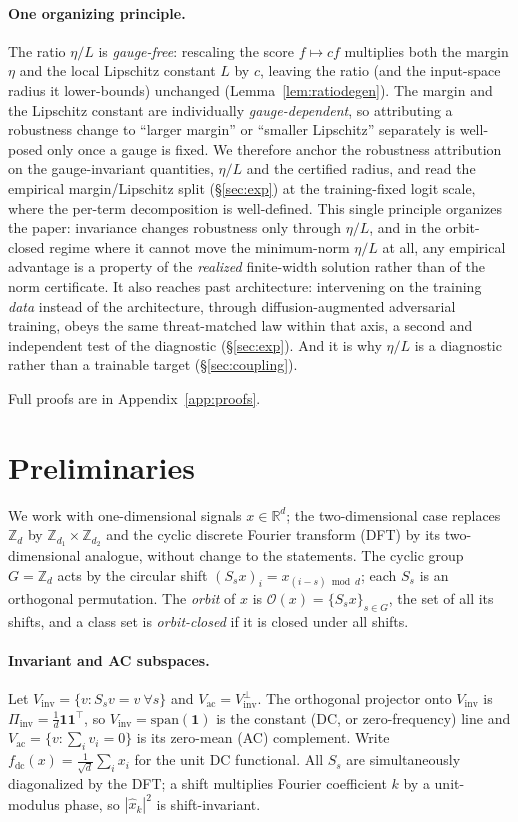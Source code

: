 \documentclass{article}
\theoremstyle{definition}
\newcommand{\R}{\mathbb{R}}
\newcommand{\Z}{\mathbb{Z}}
\newcommand{\fdc}{f_{\mathrm{dc}}}
\newcommand{\Vinv}{V_{\mathrm{inv}}}
\newcommand{\Vac}{V_{\mathrm{ac}}}
\newcommand{\dd}{d}
\begin{document}
\paragraph{One organizing principle.} The ratio $\eta/L$ is \emph{gauge-free}: rescaling the score $f\mapsto cf$ multiplies both the margin $\eta$ and the local Lipschitz constant $L$ by $c$, leaving the ratio (and the input-space radius it lower-bounds) unchanged (Lemma~\ref{lem:ratiodegen}). The margin and the Lipschitz constant are individually \emph{gauge-dependent}, so attributing a robustness change to ``larger margin'' or ``smaller Lipschitz'' separately is well-posed only once a gauge is fixed. We therefore anchor the robustness attribution on the gauge-invariant quantities, $\eta/L$ and the certified radius, and read the empirical margin/Lipschitz split (\S\ref{sec:exp}) at the training-fixed logit scale, where the per-term decomposition is well-defined. This single principle organizes the paper: invariance changes robustness only through $\eta/L$, and in the orbit-closed regime where it cannot move the minimum-norm $\eta/L$ at all, any empirical advantage is a property of the \emph{realized} finite-width solution rather than of the norm certificate. It also reaches past architecture: intervening on the training \emph{data} instead of the architecture, through diffusion-augmented adversarial training, obeys the same threat-matched law within that axis, a second and independent test of the diagnostic (\S\ref{sec:exp}). And it is why $\eta/L$ is a diagnostic rather than a trainable target (\S\ref{sec:coupling}).

Full proofs are in Appendix~\ref{app:proofs}.

\section{Preliminaries}\label{sec:prelim}
We work with one-dimensional signals $x\in\R^{\dd}$; the two-dimensional case replaces $\Z_{\dd}$ by $\Z_{d_1}\times\Z_{d_2}$ and the cyclic discrete Fourier transform (DFT) by its two-dimensional analogue, without change to the statements. The cyclic group $G=\Z_{\dd}$ acts by the circular shift $(S_s x)_i = x_{(i-s)\bmod \dd}$; each $S_s$ is an orthogonal permutation. The \emph{orbit} of $x$ is $\mathcal{O}(x)=\{S_s x\}_{s\in G}$, the set of all its shifts, and a class set is \emph{orbit-closed} if it is closed under all shifts.

\paragraph{Invariant and AC subspaces.} Let $\Vinv=\{v: S_s v=v\ \forall s\}$ and $\Vac=\Vinv^{\perp}$. The orthogonal projector onto $\Vinv$ is $\Pi_{\mathrm{inv}}=\tfrac1\dd \mathbf 1\mathbf 1^\top$, so $\Vinv=\mathrm{span}(\mathbf 1)$ is the constant (DC, or zero-frequency) line and $\Vac=\{v:\sum_i v_i=0\}$ is its zero-mean (AC) complement. Write $\fdc(x)=\tfrac{1}{\sqrt\dd}\sum_i x_i$ for the unit DC functional. All $S_s$ are simultaneously diagonalized by the DFT; a shift multiplies Fourier coefficient $k$ by a unit-modulus phase, so $|\hat x_k|^2$ is shift-invariant.
\end{document}
